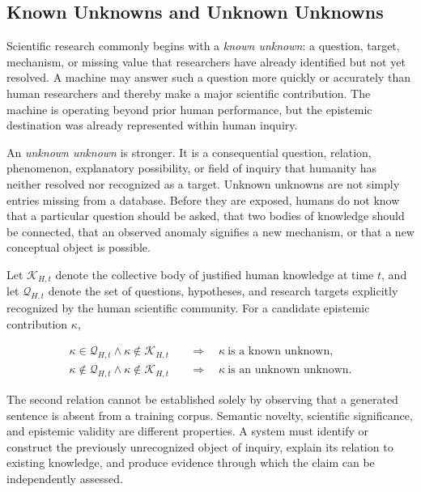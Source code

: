 \subsection{\textbf{Known Unknowns and Unknown Unknowns}}

Scientific research commonly begins with a \emph{known unknown}: a question,
target, mechanism, or missing value that researchers have already identified
but not yet resolved. A machine may answer such a question more quickly or
accurately than human researchers and thereby make a major scientific
contribution. The machine is operating beyond prior human performance, but the
epistemic destination was already represented within human inquiry.

An \emph{unknown unknown} is stronger. It is a consequential question,
relation, phenomenon, explanatory possibility, or field of inquiry that
humanity has neither resolved nor recognized as a target. Unknown unknowns are
not simply entries missing from a database. Before they are exposed, humans do
not know that a particular question should be asked, that two bodies of
knowledge should be connected, that an observed anomaly signifies a new
mechanism, or that a new conceptual object is possible.

Let $\mathcal{K}_{H,t}$ denote the collective body of justified human knowledge
at time $t$, and let $\mathcal{Q}_{H,t}$ denote the set of questions, hypotheses,
and research targets explicitly recognized by the human scientific community.
For a candidate epistemic contribution $\kappa$,

\begin{equation}
\begin{aligned}
\kappa \in \mathcal{Q}_{H,t}
\land \kappa \notin \mathcal{K}_{H,t}
&\quad\Longrightarrow\quad
\kappa\ \text{is a known unknown},\\
\kappa \notin \mathcal{Q}_{H,t}
\land \kappa \notin \mathcal{K}_{H,t}
&\quad\Longrightarrow\quad
\kappa\ \text{is an unknown unknown}.
\end{aligned}
\label{eq:known_unknowns}
\end{equation}

The second relation cannot be established solely by observing that a generated
sentence is absent from a training corpus. Semantic novelty, scientific
significance, and epistemic validity are different properties. A system must
identify or construct the previously unrecognized object of inquiry, explain
its relation to existing knowledge, and produce evidence through which the
claim can be independently assessed.

